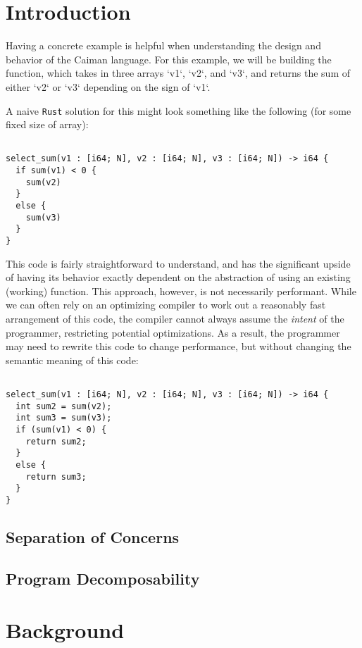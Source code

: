 \section{Introduction}
\label{sec:intro}

Having a concrete example is helpful when understanding the design and behavior of the Caiman language.
For this example, we will be building the  function, which takes in three arrays `v1`, `v2`, and `v3`, and returns the sum of either `v2` or `v3` depending on the sign of `v1`.

A naive \texttt{Rust} solution for this might look something like the following (for some fixed size of array):
%
\begin{lstlisting}

select_sum(v1 : [i64; N], v2 : [i64; N], v3 : [i64; N]) -> i64 {
  if sum(v1) < 0 {
    sum(v2)
  } 
  else {
    sum(v3)
  }
}
\end{lstlisting}
%
This code is fairly straightforward to understand, and has the significant upside of having its behavior exactly dependent on the abstraction of using an existing (working) function.
This approach, however, is not necessarily performant.  
While we can often rely on an optimizing compiler to work out a reasonably fast arrangement of this code, the compiler cannot always assume the \textit{intent} of the programmer, restricting potential optimizations.
As a result, the programmer may need to rewrite this code to change performance, but without changing the semantic meaning of this code:
%
\begin{lstlisting}

select_sum(v1 : [i64; N], v2 : [i64; N], v3 : [i64; N]) -> i64 {
  int sum2 = sum(v2);
  int sum3 = sum(v3);
  if (sum(v1) < 0) {
    return sum2;
  } 
  else {
    return sum3;
  }
}
\end{lstlisting}
%

\subsection{Separation of Concerns}
\label{subsec:separation}

\subsection{Program Decomposability}
\label{subsec:decomposability}

\section{Background}
\label{subsec:background}

